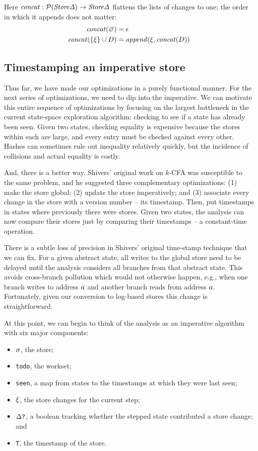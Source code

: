 \documentclass[preprint,onecolumn,9pt]{sigplanconf} %
\begin{document}
Here $\mathit{concat} : \mathcal{P}(\mathit{Store\Delta}) \to \mathit{Store\Delta}$ flattens the lists
of changes to one; the order in which it appends does not matter:
\begin{align*}
\mathit{concat}(\varnothing) &= \epsilon \\
\mathit{concat}(\{\xi\}\cup D) &= \mathit{append}(\xi, \mathit{concat}(D))
\end{align*}


\subsection{Timestamping an imperative store}

Thus far, we have made our optimizations in a purely functional
manner. For the next series of optimizations, we need to dip into the
imperative. We can motivate this entire sequence of optimizations by
focusing on the largest bottleneck in the current state-space
exploration algorithm: checking to see if a state has already been
seen. Given two states, checking equality is expensive because the
stores within each are large, and every entry must be checked against
every other. Hashes can sometimes rule out inequality relatively
quickly, but the incidence of collisions and actual equality is
costly.

And, there is a better way. Shivers' original work on $k$-CFA was
susceptible to the same problem, and he suggested three complementary
optimizations: (1) make the store global; (2) update the store
imperatively; and (3) associate every change in the store with a
version number -- its timestamp. Then, put timestamps in states
where previously there were stores. Given two states, the analysis can
now compare their stores just by comparing their timestamps -- a
constant-time operation.

There is a subtle loss of precision in Shivers' original time-stamp
technique that we can fix. For a given abstract state, all writes to
the global store need to be delayed until the analysis considers all
branches from that abstract state. This avoids cross-branch pollution
which would not otherwise happen, e.g., when one branch writes to
address $a$ and another branch reads from address
$a$. Fortunately, given our conversion to log-based stores this
change is straightforward.

At this point, we can begin to think of the analysis as an imperative
algorithm with six major components:
%
\begin{itemize}
 \item{$\sigma$, the store;}
 \item{{\tt todo}, the workset;}
 \item{{\tt seen}, a map from states to the timestamps at which they were last seen;}
 \item{$\xi$, the store changes for the current step;}
 \item{$\Delta\mbox{{\tt ?}}$, a boolean tracking whether the stepped state contributed a store change; and}
 \item{{\tt T}, the timestamp of the store.}
\end{itemize}
\end{document}
